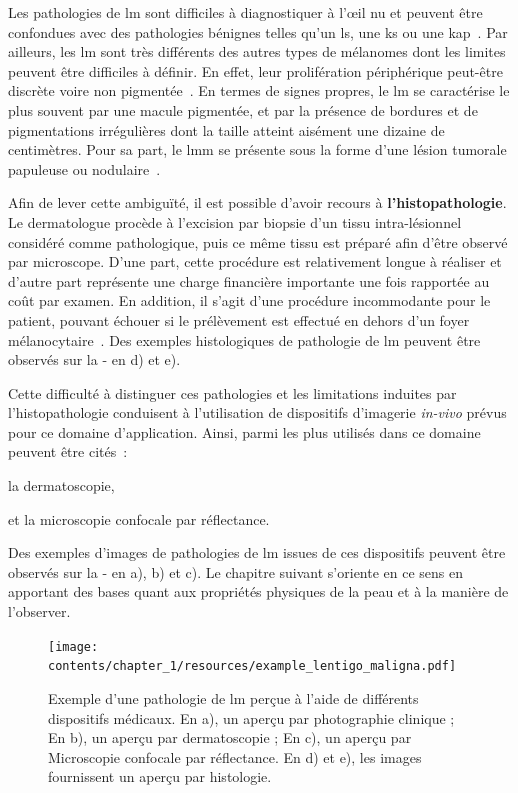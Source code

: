 Les pathologies de \gls{lm} sont difficiles à diagnostiquer à l’œil nu et peuvent être confondues avec des pathologies bénignes telles qu'un \gls{ls}, une \gls{ks} ou une \gls{kap}~\cite{LeDuff2014}. Par ailleurs, les \gls{lm} sont très différents des autres types de mélanomes dont les limites peuvent être difficiles à définir. En effet, leur prolifération périphérique peut-être discrète voire non pigmentée~\cite{LeGal2011}. En termes de signes propres, le \gls{lm} se caractérise le plus souvent par une macule pigmentée, et par la présence de bordures et de pigmentations irrégulières dont la taille atteint aisément une dizaine de centimètres. Pour sa part, le \gls{lmm} se présente sous la forme d'une lésion tumorale papuleuse ou nodulaire~\cite{Mckenna2006, LeGal2011}.\par

Afin de lever cette ambiguïté, il est possible d'avoir recours à \textbf{l'histopathologie}. Le dermatologue procède à l'excision par biopsie d'un tissu intra-lésionnel considéré comme pathologique, puis ce même tissu est préparé afin d'être observé par microscope. D'une part, cette procédure est relativement longue à réaliser et d'autre part représente une charge financière importante une fois rapportée au coût par examen. En addition, il s'agit d'une procédure incommodante pour le patient, pouvant échouer si le prélèvement est effectué en dehors d'un foyer mélanocytaire~\cite{LeGal2011}. Des exemples histologiques de pathologie de \gls{lm} peuvent être observés sur la  - en d) et e).\par

Cette difficulté à distinguer ces pathologies et les limitations induites par l'histopathologie conduisent à l'utilisation de dispositifs d'imagerie \textit{in-vivo} prévus pour ce domaine d'application. Ainsi, parmi les plus utilisés dans ce domaine peuvent être cités~:
\begin{inlinerate}
    \item la dermatoscopie,
    \item et la microscopie confocale par réflectance.
\end{inlinerate} Des exemples d'images de pathologies de \gls{lm} issues de ces dispositifs peuvent être observés sur la  - en a), b) et c). Le chapitre suivant s'oriente en ce sens en apportant des bases quant aux propriétés physiques de la peau et à la manière de l'observer.\par

\begin{figure}[H]
    \centering
    \texttt{[image: contents/chapter\_1/resources/example\_lentigo\_maligna.pdf]}
    \caption{Exemple d'une pathologie de \gls{lm} perçue à l'aide de différents dispositifs médicaux. En a), un aperçu par photographie clinique ; En b), un aperçu par dermatoscopie ; En c), un aperçu par Microscopie confocale par réflectance. En d) et e), les images fournissent un aperçu par histologie.}
    \label{fig:example_lentigo_maligna}
\end{figure}\par